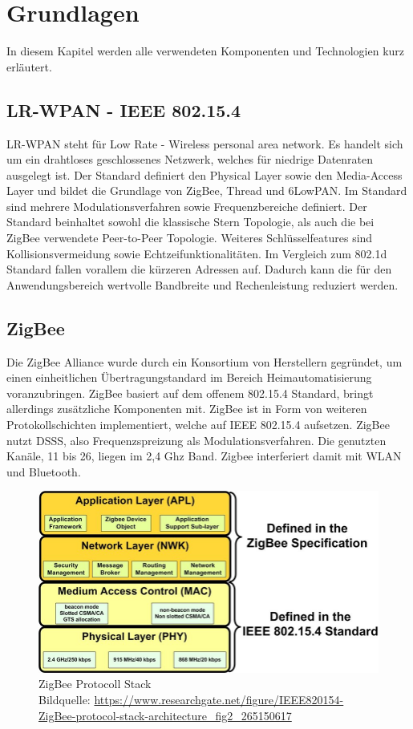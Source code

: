 \chapter{Grundlagen}

In diesem Kapitel werden alle verwendeten Komponenten und Technologien kurz erläutert.

\section{LR-WPAN - IEEE 802.15.4}

LR-WPAN \cite{lrwpan} steht für \grqq Low Rate - Wireless personal area network\grqq{}. Es handelt sich um ein drahtloses geschlossenes Netzwerk, welches für 
niedrige Datenraten ausgelegt ist. Der Standard definiert den Physical Layer sowie den Media-Access Layer und bildet die Grundlage von ZigBee, Thread und 6LowPAN.
Im Standard sind mehrere Modulationsverfahren sowie Frequenzbereiche definiert. Der Standard beinhaltet sowohl die klassische Stern Topologie, als auch die bei 
ZigBee verwendete Peer-to-Peer Topologie. Weiteres Schlüsselfeatures sind Kollisionsvermeidung sowie Echtzeifunktionalitäten. Im Vergleich zum 802.1d Standard 
fallen vorallem die kürzeren Adressen auf. Dadurch kann die für den Anwendungsbereich wertvolle Bandbreite und Rechenleistung reduziert werden. 

\section{ZigBee}

Die ZigBee Alliance wurde durch ein Konsortium von Herstellern gegründet, um einen einheitlichen Übertragungstandard
im Bereich Heimautomatisierung voranzubringen. ZigBee basiert auf dem offenem 802.15.4 Standard, bringt allerdings zusätzliche Komponenten mit.
ZigBee ist in Form von weiteren Protokollschichten implementiert, welche auf IEEE 802.15.4 aufsetzen. ZigBee nutzt DSSS, also Frequenzspreizung als Modulationsverfahren.
Die genutzten Kanäle, 11 bis 26, liegen im 2,4 Ghz Band. Zigbee interferiert damit mit WLAN und Bluetooth.

\begin{figure}[H]
  \centering
  \includegraphics[width=1\textwidth]{media/Zigbee Stack.jpg}
  \caption{ZigBee Protocoll Stack \\ Bildquelle: \url{https://www.researchgate.net/figure/IEEE820154-ZigBee-protocol-stack-architecture_fig2_265150617}}
\end{figure}

